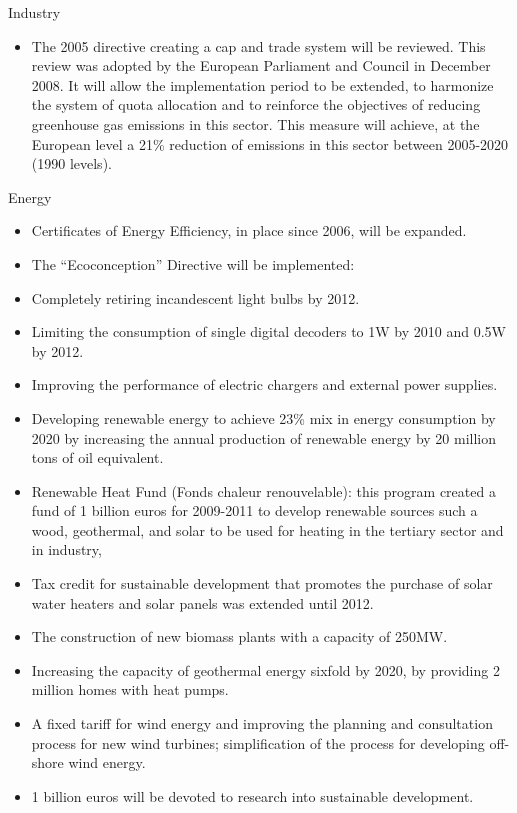Industry
\begin{itemize}
	\item The 2005 directive creating a cap and trade system will be reviewed. This review was adopted by the European Parliament and Council in December 2008. It will allow the implementation period to be extended, to harmonize the system of quota allocation and to reinforce the objectives of reducing greenhouse gas emissions in this sector. This measure will achieve, at the European level a 21\% reduction of emissions in this sector between 2005-2020 (1990 levels).
\end{itemize}



Energy
\begin{itemize}
	\item Certificates of Energy Efficiency, in place since 2006, will be expanded.
	\item The “Ecoconception” Directive will be implemented:
	\item Completely retiring incandescent light bulbs by 2012.
	\item Limiting the consumption of single digital decoders to 1W by 2010 and 0.5W by 2012.
	\item Improving the performance of electric chargers and external power supplies.
	\item Developing renewable energy to achieve 23\% mix in energy consumption by 2020 by increasing the annual production of renewable energy by 20 million tons of oil equivalent.
	\item Renewable Heat Fund (Fonds chaleur renouvelable): this program created a fund of 1 billion euros for 2009-2011 to develop renewable sources such a wood, geothermal, and solar to be used for heating in the tertiary sector and in industry,
	\item Tax credit for sustainable development that promotes the purchase of solar water heaters and solar panels was extended until 2012.
	\item The construction of new biomass plants with a capacity of 250MW.
	\item Increasing the capacity of geothermal energy sixfold by 2020, by providing 2 million homes with heat pumps.
	\item A fixed tariff for wind energy and improving the planning and consultation process for new wind turbines; simplification of the process for developing off-shore wind energy.
	\item 1 billion euros will be devoted to research into sustainable development. 
\end{itemize}



